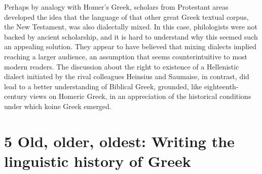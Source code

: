 Perhaps by analogy with Homer’s Greek, scholars from Protestant areas developed the idea that the language of that other great Greek textual corpus, the New Testament, was also dialectally mixed. In this case, philologists were not backed by ancient scholarship, and it is hard to understand why this seemed such an appealing solution. They appear to have believed that mixing dialects implied reaching a larger audience, an assumption that seems counterintuitive to most modern readers. The discussion about the right to existence of a Hellenistic dialect initiated by the rival colleagues Heinsius and Saumaise, in contrast, did lead to a better understanding of Biblical Greek, grounded, like eighteenth-century views on Homeric Greek, in an appreciation of the historical conditions under which koine Greek emerged.

\section{\textsc{5} Old, older, oldest: Writing the linguistic history of Greek}
\hypertarget{Toc19704834}{}
